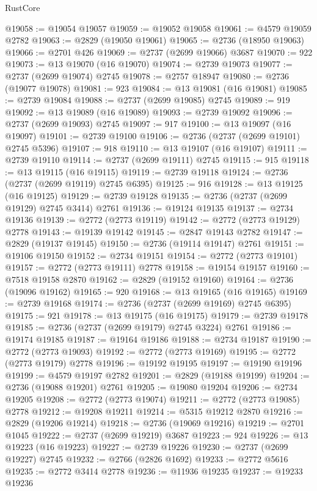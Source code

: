 \begin{lexlean}{RustCore}
\begin{coremodule}
@19058 := @19054 @19057
@19059 := @19052 @19058
@19061 := @4579 @19059 @2782
@19063 := @2829 (@19050 @19061)
@19065 := @2736 (@18950 @19063)
@19066 := @2701 @426
@19069 := @2737 (@2699 @19066) @3687
@19070 := 922
@19073 := @13 @19070 (@16 @19070)
@19074 := @2739 @19073
@19077 := @2737 (@2699 @19074) @2745
@19078 := @2757 @18947
@19080 := @2736 (@19077 @19078)
@19081 := 923
@19084 := @13 @19081 (@16 @19081)
@19085 := @2739 @19084
@19088 := @2737 (@2699 @19085) @2745
@19089 := 919
@19092 := @13 @19089 (@16 @19089)
@19093 := @2739 @19092
@19096 := @2737 (@2699 @19093) @2745
@19097 := 917
@19100 := @13 @19097 (@16 @19097)
@19101 := @2739 @19100
@19106 := @2736 (@2737 (@2699 @19101) @2745 @5396)
@19107 := 918
@19110 := @13 @19107 (@16 @19107)
@19111 := @2739 @19110
@19114 := @2737 (@2699 @19111) @2745
@19115 := 915
@19118 := @13 @19115 (@16 @19115)
@19119 := @2739 @19118
@19124 := @2736 (@2737 (@2699 @19119) @2745 @6395)
@19125 := 916
@19128 := @13 @19125 (@16 @19125)
@19129 := @2739 @19128
@19135 := @2736 (@2737 (@2699 @19129) @2745 @3414) @2761
@19136 := @19124 @19135
@19137 := @2734 @19136
@19139 := @2772 (@2773 @19119)
@19142 := @2772 (@2773 @19129) @2778
@19143 := @19139 @19142
@19145 := @2847 @19143 @2782
@19147 := @2829 (@19137 @19145)
@19150 := @2736 (@19114 @19147) @2761
@19151 := @19106 @19150
@19152 := @2734 @19151
@19154 := @2772 (@2773 @19101)
@19157 := @2772 (@2773 @19111) @2778
@19158 := @19154 @19157
@19160 := @7518 @19158 @2870
@19162 := @2829 (@19152 @19160)
@19164 := @2736 (@19096 @19162)
@19165 := 920
@19168 := @13 @19165 (@16 @19165)
@19169 := @2739 @19168
@19174 := @2736 (@2737 (@2699 @19169) @2745 @6395)
@19175 := 921
@19178 := @13 @19175 (@16 @19175)
@19179 := @2739 @19178
@19185 := @2736 (@2737 (@2699 @19179) @2745 @3224) @2761
@19186 := @19174 @19185
@19187 := @19164 @19186
@19188 := @2734 @19187
@19190 := @2772 (@2773 @19093)
@19192 := @2772 (@2773 @19169)
@19195 := @2772 (@2773 @19179) @2778
@19196 := @19192 @19195
@19197 := @19190 @19196
@19199 := @4579 @19197 @2782
@19201 := @2829 (@19188 @19199)
@19204 := @2736 (@19088 @19201) @2761
@19205 := @19080 @19204
@19206 := @2734 @19205
@19208 := @2772 (@2773 @19074)
@19211 := @2772 (@2773 @19085) @2778
@19212 := @19208 @19211
@19214 := @5315 @19212 @2870
@19216 := @2829 (@19206 @19214)
@19218 := @2736 (@19069 @19216)
@19219 := @2701 @1045
@19222 := @2737 (@2699 @19219) @3687
@19223 := 924
@19226 := @13 @19223 (@16 @19223)
@19227 := @2739 @19226
@19230 := @2737 (@2699 @19227) @2745
@19232 := @2766 (@2826 @1692)
@19233 := @2772 @5616
@19235 := @2772 @3414 @2778
@19236 := @11936 @19235
@19237 := @19233 @19236

\end{coremodule}
\end{lexlean}
